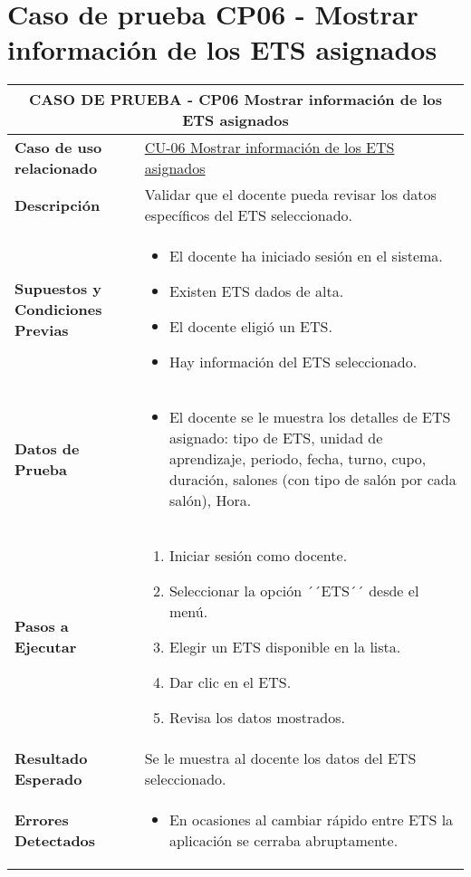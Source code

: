 \section{Caso de prueba CP06 - Mostrar información de los ETS asignados}

\begin{longtable}{|p{5cm}|p{10cm}|}
	\hline
	\multicolumn{2}{|c|}{\textbf{CASO DE PRUEBA - CP06 Mostrar información de los ETS asignados}} \\
	\hline
	\textbf{Caso de uso relacionado} & \hyperref[CU-06]{CU-06 Mostrar información de los ETS asignados} \\
	\hline
	\textbf{Descripción} & Validar que el docente pueda revisar los datos específicos del ETS seleccionado. \\
	\hline
	\textbf{Supuestos y Condiciones Previas} & 
	\begin{itemize}
		\item El docente ha iniciado sesión en el sistema.
		\item Existen ETS dados de alta.
		\item El docente eligió un ETS.
		\item Hay información del ETS seleccionado.
	\end{itemize} \\
	\hline
	\textbf{Datos de Prueba} & 
	\begin{itemize}
		\item El docente se le muestra los detalles de ETS asignado: tipo de ETS, unidad de aprendizaje, periodo, fecha, turno, cupo, duración, salones (con tipo de salón por cada salón), Hora.
	\end{itemize} \\
	\hline
	\textbf{Pasos a Ejecutar} & 
	\begin{enumerate}
		\item Iniciar sesión como docente.
		\item Seleccionar la opción ´´ETS´´ desde el menú.
		\item Elegir un ETS disponible en la lista.
		\item Dar clic en el ETS.
		\item Revisa los datos mostrados.
	\end{enumerate} \\
	\hline
	\textbf{Resultado Esperado} & 
	Se le muestra al docente los datos del ETS seleccionado. \\
	\hline
	\textbf{Errores Detectados} & 
	\begin{itemize}
		\item En ocasiones al cambiar rápido entre ETS la aplicación se cerraba abruptamente.
		

\end{itemize}
\end{longtable}
